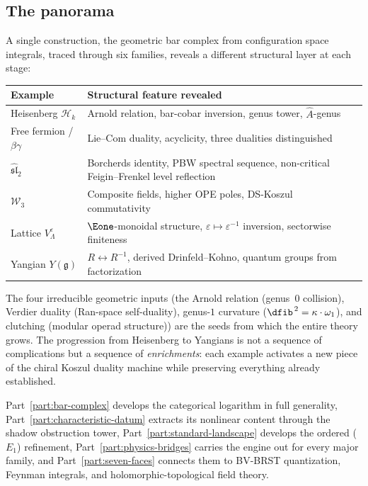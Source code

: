 \subsection{The panorama}

A single construction, the geometric bar complex from configuration
space integrals, traced through six families, reveals a different
structural layer at each stage:

\begin{center}
\small
\renewcommand{\arraystretch}{1.3}
\begin{tabular}{l|l}
\textbf{Example} & \textbf{Structural feature revealed} \\
\hline
Heisenberg $\mathcal{H}_k$
 & Arnold relation, bar-cobar inversion, genus tower,
 $\hat{A}$-genus \\
Free fermion / $\beta\gamma$
 & Lie--Com duality, acyclicity, three dualities distinguished \\
$\widehat{\mathfrak{sl}}_2$
 & Borcherds identity, PBW spectral sequence,
 non-critical Feigin--Frenkel level reflection \\
$\mathcal{W}_3$
 & Composite fields, higher OPE poles,
 DS-Koszul commutativity \\
Lattice $V_\Lambda^\varepsilon$
 & $\Eone$-monoidal structure, $\varepsilon \mapsto \varepsilon^{-1}$
 inversion, sectorwise finiteness \\
Yangian $Y(\mathfrak{g})$
 & $R \leftrightarrow R^{-1}$,
 derived Drinfeld--Kohno,
 quantum groups from factorization
\end{tabular}
\end{center}

The four irreducible geometric inputs (the Arnold relation (genus~$0$
collision), Verdier duality (Ran-space self-duality), genus-$1$ curvature
($\dfib^{\,2} = \kappa \cdot \omega_1$), and clutching (modular operad
structure)) are the seeds from which the entire theory grows. The
progression from Heisenberg to Yangians is not a sequence of
complications but a sequence of \emph{enrichments}: each example
activates a new piece of the chiral Koszul duality machine while
preserving everything already established.

Part~\ref{part:bar-complex} develops the categorical logarithm in full generality,
Part~\ref{part:characteristic-datum} extracts its nonlinear content through the shadow obstruction tower,
Part~\ref{part:standard-landscape} develops the ordered ($E_1$) refinement,
Part~\ref{part:physics-bridges} carries the engine out for every major family, and Part~\ref{part:seven-faces}
connects them to BV-BRST quantization, Feynman integrals, and
holomorphic-topological field theory.

